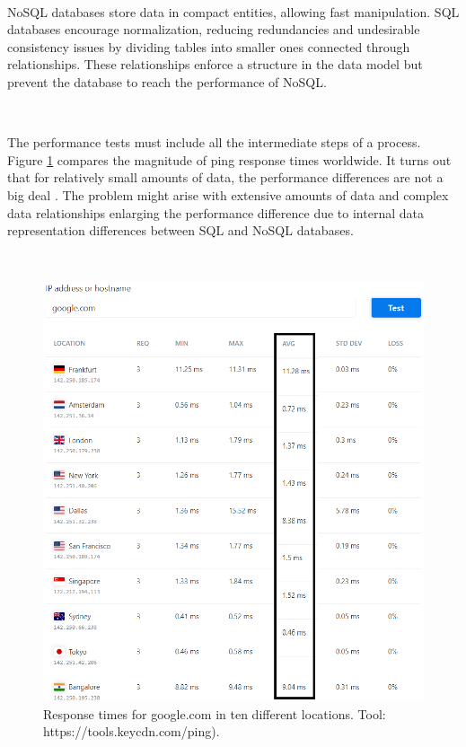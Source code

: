 \documentclass[12pt,english]{article} %
\begin{document}
\

NoSQL databases store data in compact entities, allowing fast manipulation.
SQL databases encourage normalization, reducing redundancies and undesirable consistency issues by dividing tables into smaller ones connected through relationships.
These relationships enforce a structure in the data model but prevent the database to reach the performance of NoSQL.

\

The performance tests must include all the intermediate steps of a process.
Figure \ref{fig:network-worldwide-ping-tests} compares the magnitude of ping response times worldwide.
It turns out that for relatively small amounts of data, the performance differences are not a big deal \cite{comparison-query-performance-relational-and-non-relational-databases}.
The problem might arise with extensive amounts of data and complex data relationships enlarging the performance difference due to internal data representation differences between SQL and NoSQL databases.

\

\begin{figure}[H]
    \centering
    \includegraphics[scale=0.65]{img/cloud/network-worldwide-ping-tests.png}
    \caption{Response times for google.com in ten different locations. Tool: https://tools.keycdn.com/ping).}
    \label{fig:network-worldwide-ping-tests}
\end{figure}
\end{document}
